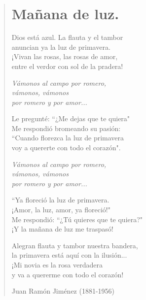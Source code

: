 \documentclass[12pt, twoside]{book}
\begin{document}
\begin{verse}
\begin{center}
\section{Mañana de luz.}
\end{center}

Dios está azul. La flauta y el tambor\\
anuncian ya la luz de primavera.\\
¡Vivan las rosas, las rosas de amor,\\
entre el verdor con sol de la pradera!
\newline

\textit{Vámonos al campo por romero,\\
vámonos, vámonos\\
por romero y por amor...}
\newline

Le pregunté: ``¿Me dejas que te quiera"\\
Me respondió bromeando su pasión:\\
``Cuando florezca la luz de primavera\\
voy a quererte con todo el corazón".
\newline

\textit{Vámonos al campo por romero,\\
vámonos, vámonos\\
por romero y por amor...}
\newline

``Ya floreció la luz de primavera.\\
¡Amor, la luz, amor, ya floreció!"\\
Me respondió: ``¿Tú quieres que te quiera?"\\
¡Y la mañana de luz me traspasó!\newline

Alegran flauta y tambor nuestra bandera,\\
la primavera está aquí con la ilusión...\\
¡Mi novia es la rosa verdadera\\
y va a quererme con todo el corazón!\newline

Juan Ramón Jiménez (1881-1956)


\end{verse}
\newpage
\end{document}
